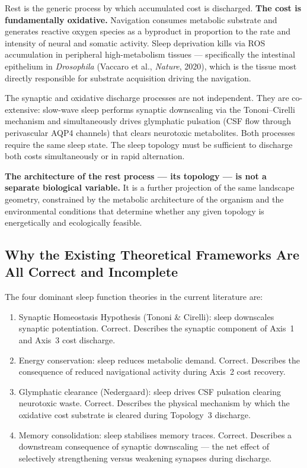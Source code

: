 \documentclass[10pt, a4paper]{article}
\begin{document}
Rest is the generic process by which
accumulated cost is discharged.
\textbf{The cost is fundamentally oxidative.}
Navigation consumes metabolic substrate
and generates reactive oxygen species
as a byproduct in proportion to the
rate and intensity of neural and somatic
activity. Sleep deprivation kills via
ROS accumulation in peripheral
high-metabolism tissues --- specifically
the intestinal epithelium in
\textit{Drosophila} (Vaccaro et al.,
\textit{Nature}, 2020), which is the
tissue most directly responsible for
substrate acquisition driving the
navigation.

The synaptic and oxidative discharge
processes are not independent. They are
co-extensive: slow-wave sleep performs
synaptic downscaling via the
Tononi--Cirelli mechanism and
simultaneously drives glymphatic
pulsation (CSF flow through perivascular
AQP4 channels) that clears neurotoxic
metabolites. Both processes require
the same sleep state. The sleep topology
must be sufficient to discharge both
costs simultaneously or in rapid
alternation.

\textbf{The architecture of the rest
process --- its topology --- is not a
separate biological variable.} It is a
further projection of the same landscape
geometry, constrained by the metabolic
architecture of the organism and the
environmental conditions that determine
whether any given topology is
energetically and ecologically feasible.

\subsection{Why the Existing Theoretical
Frameworks Are All Correct and Incomplete}

The four dominant sleep function theories
in the current literature are:

\begin{enumerate}[itemsep=0.2em]
  \item Synaptic Homeostasis Hypothesis
    (Tononi \& Cirelli): sleep downscales
    synaptic potentiation. Correct.
    Describes the synaptic component of
    Axis~1 and Axis~3 cost discharge.
  \item Energy conservation: sleep reduces
    metabolic demand. Correct. Describes
    the consequence of reduced navigational
    activity during Axis~2 cost recovery.
  \item Glymphatic clearance (Nedergaard):
    sleep drives CSF pulsation clearing
    neurotoxic waste. Correct. Describes
    the physical mechanism by which the
    oxidative cost substrate is cleared
    during Topology~3 discharge.
  \item Memory consolidation: sleep
    stabilises memory traces. Correct.
    Describes a downstream consequence
    of synaptic downscaling --- the net
    effect of selectively strengthening
    versus weakening synapses during
    discharge.
\end{enumerate}
\end{document}
